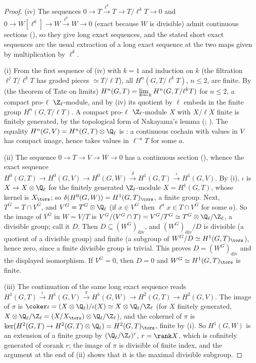 \begin{proof}
(iv) The sequences $0\to T\xrightarrow{\ell^k}T\to T/\ell^kT\to0$ and $0\to W[\ell^k]\to W\xrightarrow{\ell^k}W\to0$ (exact because $W$ is divisible) admit continuous sections
(), so they give long exact sequences, and the stated short exact sequences are the usual extraction of a long exact sequence at the
two maps given by multiplication by $\ell^k$.

(i) From the first sequence of (iv) with $k=1$ and induction on $k$ (the filtration $\ell^jT/\ell^kT$ has graded pieces $\simeq T/\ell T$), all $H^n(G,T/\ell^kT)$, $n\le2$, are finite.
By  (the theorem of Tate on limits) $H^n(G,T)=\varprojlim_kH^n(G,T/\ell^kT)$ for $n\le2$, a compact pro-$\ell$ $\Z_\ell$-module, and by (iv) its
quotient by $\ell$ embeds in the finite group $H^n(G,T/\ell T)$. A compact pro-$\ell$ $\Z_\ell$-module $X$ with $X/\ell X$ finite is finitely generated, by the topological form of
Nakayama's lemma (; \cite[Appendix B]{Rubin}).
The equality $H^n(G,V)=H^n(G,T)\otimes\Q_\ell$ is : a continuous cochain with values in $V$ has compact image, hence takes values in $\ell^{-a}T$ for
some $a$.

(ii) The sequence $0\to T\to V\to W\to0$ has a continuous section (), whence the exact sequence
$H^0(G,T)\to H^0(G,V)\to H^0(G,W)\xrightarrow{\delta}H^1(G,T)\xrightarrow{\iota}H^1(G,V)$. By (i), $\iota$ is $X\to X\otimes\Q_\ell$ for the finitely generated $\Z_\ell$-module
$X=H^1(G,T)$, whose kernel is $X_{\tors}$; so $\delta(H^0(G,W))=H^1(G,T)_{\tors}$, a finite group. Next, $T^G=T\cap V^G$, and $V^G=T^G\otimes\Q_\ell$ (if $x\in V^G$
then $\ell^ax\in T\cap V^G$ for some $a$). So the image of $V^G$ in $W=V/T$ is $V^G/(V^G\cap T)=V^G/T^G\simeq T^G\otimes\Q_\ell/\Z_\ell$, a divisible group; call it $D$.
Then $D\subseteq(W^G)_{\mathrm{div}}$, and $(W^G)_{\mathrm{div}}/D$ is divisible (a quotient of a divisible group) and finite (a subgroup of $W^G/D\simeq H^1(G,T)_{\tors}$),
hence zero, since a finite divisible group is trivial. This proves $D=(W^G)_{\mathrm{div}}$ and the displayed isomorphism. If $V^G=0$, then $D=0$ and $W^G\simeq H^1(G,T)_{\tors}$
is finite.

(iii) The continuation of the same long exact sequence reads $H^1(G,T)\xrightarrow{\iota}H^1(G,V)\xrightarrow{\pi}H^1(G,W)\to H^2(G,T)\to H^2(G,V)$. The image of $\pi$
is $\coker\iota=(X\otimes\Q_\ell)/\iota(X)\simeq X\otimes\Q_\ell/\Z_\ell$ (for $X$ finitely generated, $X\otimes\Q_\ell/\Z_\ell=(X/X_{\tors})\otimes\Q_\ell/\Z_\ell$), and the cokernel of $\pi$ is
$\ker(H^2(G,T)\to H^2(G,T)\otimes\Q_\ell)=H^2(G,T)_{\tors}$, finite by (i). So $H^1(G,W)$ is an extension of a finite group by $(\Q_\ell/\Z_\ell)^r$, $r=\rank X$, which is
cofinitely generated of corank $r$; the image of $\pi$ is divisible of finite index, and the argument at the end of (ii) shows that it is the maximal divisible
subgroup.
\end{proof}

